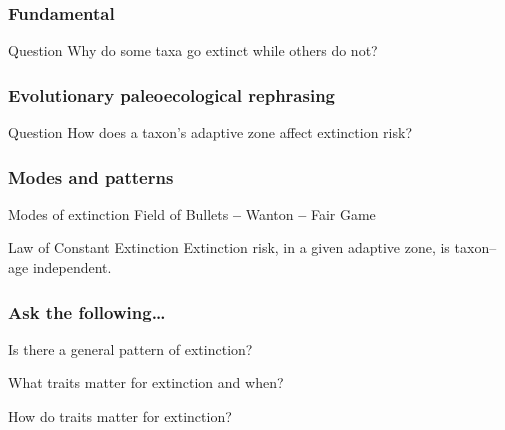 \documentclass{beamer}
\begin{document}
\begin{frame}
  \frametitle{Fundamental}

  \begin{alertblock}{Question}
    Why do some taxa go extinct while others do not?
  \end{alertblock}
\end{frame}

\begin{frame}
  \frametitle{Evolutionary paleoecological rephrasing}

  \begin{block}{Question}
    How does a taxon's adaptive zone affect extinction risk?
  \end{block}
\end{frame}

\begin{frame} 
  \frametitle{Modes and patterns}

  \begin{block}{Modes of extinction \tiny{}}
     Field of Bullets 
     \textbf{--} 
     Wanton 
     \textbf{--} 
     Fair Game 
  \end{block}

  \vspace{1cm}

  \begin{block}{Law of Constant Extinction \tiny{}}
    Extinction risk, in a given adaptive zone, is taxon--age independent.
  \end{block}
\end{frame}

\begin{frame}
  \frametitle{Ask the following\dots}

  \begin{center}
    Is there a \alert{general pattern} of extinction?

    \vspace{0.75cm}

    \alert{What} traits matter for extinction and \alert{when}?

    \vspace{0.75cm}

    \alert{How} do traits matter for extinction?
  \end{center}
\end{frame}
\end{document}
